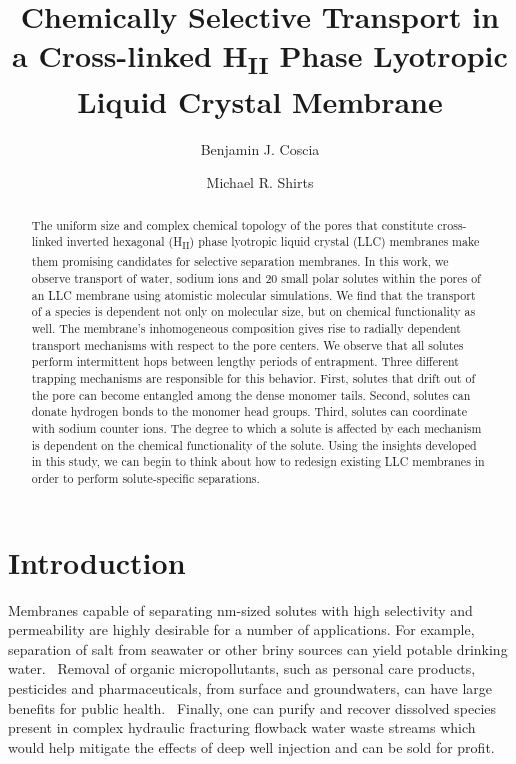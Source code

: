 \documentclass[journal=jpcbfk,manuscript=article]{achemso}
\title{Chemically Selective Transport in a Cross-linked H\textsubscript{II} Phase Lyotropic Liquid Crystal Membrane}
\author{Benjamin J. Coscia}
\affiliation{Department of Chemical and Biological Engineering, University of Colorado Boulder, Boulder, CO 80309, USA}
\author{Michael R. Shirts}
\affiliation{Department of Chemical and Biological Engineering, University of Colorado Boulder, Boulder, CO 80309, USA}
\begin{document}
  \graphicspath{{./figures/}}
  
  \begin{abstract}

  The uniform size and complex chemical topology of the pores that 
  constitute cross-linked inverted hexagonal (H\textsubscript{II})
  phase lyotropic liquid crystal (LLC) membranes make them promising
  candidates for selective separation membranes. 
  In this work, we observe transport
  of water, sodium ions and 20 small polar solutes within the pores 
  of an LLC membrane using atomistic molecular simulations. We 
  find that the transport of a species is dependent not only on 
  molecular size, but on chemical functionality as well. The 
  membrane's inhomogeneous composition gives rise to radially dependent
  transport mechanisms with respect to the pore centers. We observe
  that all solutes perform intermittent hops between lengthy
  periods of entrapment. Three different trapping mechanisms are 
  responsible for this behavior. First, solutes that drift
  out of the pore can become entangled among the dense monomer
  tails. Second, solutes can donate hydrogen bonds to the monomer
  head groups. Third, solutes can coordinate with sodium counter ions.
  The degree to which a solute is affected by each mechanism is 
  dependent on the chemical functionality of the solute. Using the
  insights developed in this study, we can begin to think about 
  how to redesign existing LLC membranes in order to perform 
  solute-specific separations.
   
  \end{abstract}

  \section{Introduction}

  Membranes capable of separating nm-sized solutes with high selectivity and
  permeability are highly desirable for a number of applications. For example,
  separation of salt from seawater or other briny sources can yield potable
  drinking water.~\cite{fritzmann_state---art_2007} Removal of organic
  micropollutants, such as personal care products, pesticides and
  pharmaceuticals, from surface and groundwaters, can have large benefits for
  public health.~\cite{schwarzenbach_challenge_2006} Finally, one can purify and
  recover dissolved species present in complex hydraulic fracturing flowback
  water waste streams which would help mitigate the effects of deep well
  injection and can be sold for profit.~\cite{dischinger_application_2017} 
\end{document}
